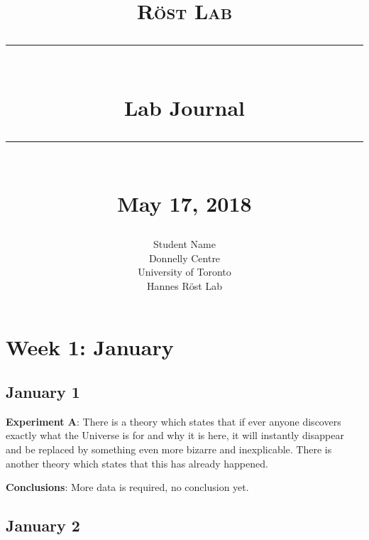 \documentclass[12pt]{report}
\newcommand{\HRule}[1]{\rule{\linewidth}{#1}}
\begin{document}
\title{ \textsc{Röst Lab}
		\\ [2.0cm]
		\HRule{0.5pt} \\
		\LARGE \textbf{{Lab Journal}}
		\HRule{2pt} \\ [0.5cm]
		\normalsize May 17, 2018\vspace*{5\baselineskip}}

\date{}

\author{
		Student Name \\ 
		Donnelly Centre\\
		University of Toronto \\
		Hannes Röst Lab }

\maketitle
\tableofcontents
\newpage

\sectionfont{\scshape}
\renewcommand\thesection{\arabic{section}.}
\renewcommand\thesubsection{\thesection\arabic{subsection}}
\sectionfont{\fontsize{8}{10}}


\section{Week 1: January}
\subsection{January 1}

\textbf{Experiment A}:
There is a theory which states that if ever anyone discovers exactly what the Universe is for and why it is here, it will instantly disappear and be replaced by something even more bizarre and inexplicable.
There is another theory which states that this has already happened. 

\textbf{Conclusions}: More data is required, no conclusion yet.

\subsection{January 2}
\end{document}
